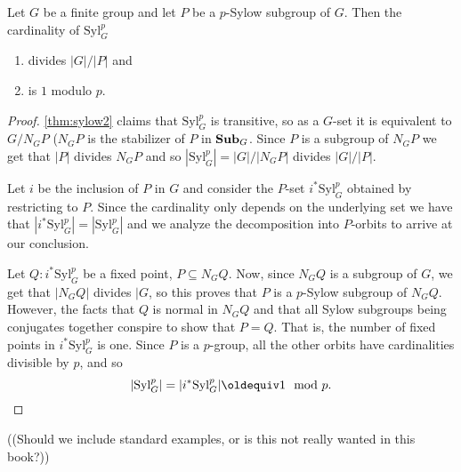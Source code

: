 \begin{theorem}
  \label{thm:sylow3}
  Let $G$ be a finite group and let $P$ be a $p$-Sylow subgroup of $G$.  Then the cardinality of $\mathrm{Syl}_G^p$
  \begin{enumerate}
  \item divides $|G|/|P|$ and 
  \item is $1$ modulo $p$.
  \end{enumerate}
\end{theorem}
\begin{proof}
  \cref{thm:sylow2} claims that $\mathrm{Syl}_G^p$ is transitive, so as a $G$-set it is equivalent to $G/N_GP$ ($N_GP$ is the stabilizer of $P$ in $\mathbf{Sub}_G$.  Since $P$ is a subgroup of $N_GP$ we get that $|P|$ divides $N_GP$ and so $|\mathrm{Syl}_G^p|=|G|/|N_GP|$ divides $|G|/|P|$.

  Let $i$ be the inclusion of $P$ in $G$ and consider the $P$-set $i^*\mathrm{Syl}_G^p$ obtained by restricting to $P$.  Since the cardinality only depends on the underlying set we have that $|i^*\mathrm{Syl}_G^p|=|\mathrm{Syl}_G^p|$ and we analyze the decomposition into $P$-orbits to arrive at our conclusion.

  Let $Q:i^*\mathrm{Syl}_G^p$ be a fixed point, \ie $P\subseteq N_GQ$.  Now, since $N_GQ$ is a subgroup of $G$, we get that $|N_GQ|$ divides $|G$, so this proves that $P$ is a $p$-Sylow subgroup of $N_GQ$.  However, the facts that $Q$ is normal in $N_GQ$ and that all Sylow subgroups being conjugates together conspire to show that $P=Q$.  That is, the number of fixed points in $i^*\mathrm{Syl}_G^p$ is one.  Since $P$ is a $p$-group, all the other orbits have cardinalities divisible by $p$, and so
  $$|\mathrm{Syl}_G^p|=|i^*\mathrm{Syl}_G^p|\oldequiv 1\mod p.$$
\end{proof}

((Should we include standard examples, or is this not really wanted in this book?))